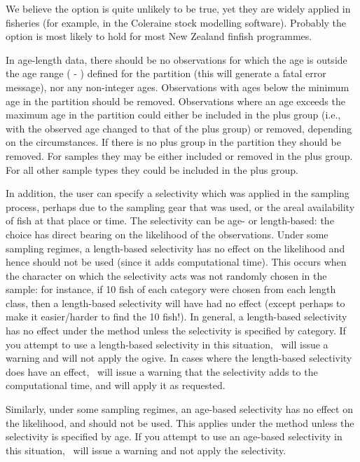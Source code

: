 We believe the  option is quite unlikely to be true, yet they are widely applied in fisheries (for example, in the Coleraine \citep{hilborn2001coleraine} stock modelling software). Probably the  option is most likely to hold for most New Zealand finfish programmes.

In age-length data, there should be no observations for which the age is outside the age range ( - ) defined for the partition (this will generate a fatal error message), nor any non-integer ages. Observations with ages below the minimum age in the partition should be removed. Observations where an age exceeds the maximum age in the partition could either be included in the plus group (i.e., with the observed age changed to that of the plus group) or removed, depending on the circumstances. If there is no plus group in the partition they should be removed. For  samples they may be either included or removed in the plus group. For all other sample types they could be included in the plus group.

In addition, the user can specify a selectivity which was applied in the sampling process, perhaps due to the sampling gear that was used, or the areal availability of fish at that place or time. The selectivity can be age- or length-based: the choice has direct bearing on the likelihood of the observations. Under some sampling regimes, a length-based selectivity has no effect on the likelihood and hence should not be used (since it adds computational time). This occurs when the character on which the selectivity acts was not randomly chosen in the sample: for instance, if 10 fish of each category were chosen from each length class, then a length-based selectivity will have had no effect (except perhaps to make it easier/harder to find the 10 fish!). In general, a length-based selectivity has no effect under the  method unless the selectivity is specified by category. If you attempt to use a length-based selectivity in this situation, \CNAME\ will issue a warning and will not apply the ogive. In cases where the length-based selectivity does have an effect, \CNAME\ will issue a warning that the selectivity adds to the computational time, and will apply it as requested.

Similarly, under some sampling regimes, an age-based selectivity has no effect on the likelihood, and should not be used. This applies under the  method unless the selectivity is specified by age. If you attempt to use an age-based selectivity in this situation, \CNAME\ will issue a warning and not apply the selectivity. 

